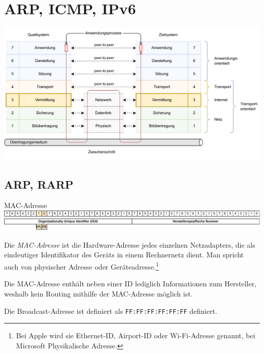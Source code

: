 \section{ARP, ICMP, IPv6}

\includegraphics[width=\textwidth]{includes/figures/defi_iso_osi_vermittlung.pdf}

\subsection{ARP, RARP}

\begin{defi}{MAC-Adresse}
    \includegraphics[width=\textwidth]{includes/figures/defi_mac_adresse.pdf}

    Die \emph{MAC-Adresse} ist die Hardware-Adresse jedes einzelnen Netzadapters, die als eindeutiger Identifikator des Geräts in einem Rechnernetz dient.
    Man spricht auch von physischer Adresse oder Geräteadresse.\footnote{Bei Apple wird sie Ethernet-ID, Airport-ID oder Wi-Fi-Adresse genannt, bei Microsoft Physikalische Adresse.}

    Die MAC-Adresse enthält neben einer ID lediglich Informationen zum Hersteller, weshalb kein Routing mithilfe der MAC-Adresse möglich ist.

    Die Broadcast-Adresse ist definiert als \texttt{FF:FF:FF:FF:FF:FF} definiert.

\end{defi}

